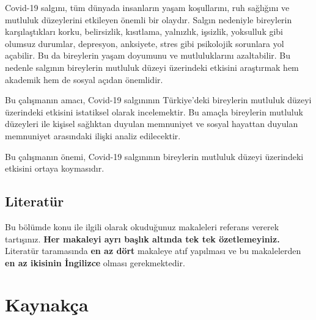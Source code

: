 \documentclass[
  12pt,
]{article}
\begin{document}
Covid-19 salgını, tüm dünyada insanların yaşam koşullarını, ruh sağlığını ve mutluluk düzeylerini etkileyen önemli bir olaydır. Salgın nedeniyle bireylerin karşılaştıkları korku, belirsizlik, kısıtlama, yalnızlık, işsizlik, yoksulluk gibi olumsuz durumlar, depresyon, anksiyete, stres gibi psikolojik sorunlara yol açabilir. Bu da bireylerin yaşam doyumunu ve mutluluklarını azaltabilir. Bu nedenle salgının bireylerin mutluluk düzeyi üzerindeki etkisini araştırmak hem akademik hem de sosyal açıdan önemlidir.

Bu çalışmanın amacı, Covid-19 salgınının Türkiye'deki bireylerin mutluluk düzeyi üzerindeki etkisini istatiksel olarak incelemektir. Bu amaçla bireylerin mutluluk düzeyleri ile kişisel sağlıktan duyulan memnuniyet ve sosyal hayattan duyulan memnuniyet arasındaki ilişki analiz edilecektir.

Bu çalışmanın önemi, Covid-19 salgınının bireylerin mutluluk düzeyi üzerindeki etkisini ortaya koymasıdır.

\hypertarget{literatuxfcr}{%
\subsection{Literatür}\label{literatuxfcr}}

Bu bölümde konu ile ilgili olarak okuduğunuz makaleleri referans vererek tartışınız. \textbf{Her makaleyi ayrı başlık altında tek tek özetlemeyiniz.} Literatür taramasında \textbf{en az dört} makaleye atıf yapılması ve bu makalelerden \textbf{en az ikisinin İngilizce} olması gerekmektedir.

\newpage

\hypertarget{references}{%
\section{Kaynakça}\label{references}}
\end{document}
